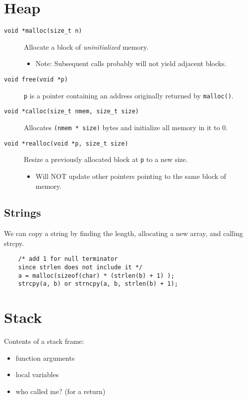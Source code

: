 \section{Heap}
\begin{description}
    \item[\texttt{void *malloc(size\_t n)}] Allocate a block of \emph{uninitialized} memory.
    \begin{itemize}
        \item Note: Subsequent calls probably will not yield adjacent blocks.
    \end{itemize}
    
    \item[\texttt{void free(void *p)}] \texttt{p} is a pointer containing an address originally returned by \texttt{malloc()}.
    
    \item[\texttt{void *calloc(size\_t nmem, size\_t size)}] Allocates \texttt{(nmem * size)} bytes and initialize all memory in it to 0.
    
    \item[\texttt{void *realloc(void *p, size\_t size)}] Resize a previously allocated block at \texttt{p} to a new size.
    \begin{itemize}
        \item Will NOT update other pointers pointing to the same block of memory.
    \end{itemize}
\end{description}

\subsection{Strings}
We can copy a string by finding the length, allocating a new array, and calling strcpy.
\begin{verbatim}
    /* add 1 for null terminator 
    since strlen does not include it */
    a = malloc(sizeof(char) * (strlen(b) + 1) ); 
    strcpy(a, b) or strncpy(a, b, strlen(b) + 1); 
\end{verbatim}


\section{Stack}
Contents of a stack frame:
\begin{itemize}
			\item function arguments
			\item local variables
			\item who called me? (for a return)
		\end{itemize}
		
